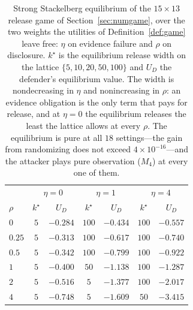 \begin{table}[t]
\caption{Strong Stackelberg equilibrium of the $15\times13$ release game
of Section~\ref{sec:numgame}, over the two weights the utilities of
Definition~\ref{def:game} leave free: $\eta$ on evidence failure and $\rho$ on
disclosure. $k^\star$ is the equilibrium release width on the lattice
$\{5,10,20,50,100\}$ and $U_D$ the defender's equilibrium value. The width is
nondecreasing in $\eta$ and nonincreasing in $\rho$: an evidence obligation is
the only term that pays for release, and at $\eta=0$ the equilibrium releases
the least the lattice allows at every $\rho$. The equilibrium is pure at all
$18$ settings---the gain from randomizing does not
exceed $4\times10^{-16}$---and the attacker plays pure observation
($M_4$) at every one of them.}
\label{tab:numgame}
\centering
\footnotesize
\begin{tabular}{@{}lcccccc@{}}
\toprule
& \multicolumn{2}{c}{$\eta=0$} & \multicolumn{2}{c}{$\eta=1$} & \multicolumn{2}{c}{$\eta=4$}\\
$\rho$ & $k^\star$ & $U_D$ & $k^\star$ & $U_D$ & $k^\star$ & $U_D$\\
\midrule
$0$ & $5$ & $-0.284$ & $100$ & $-0.434$ & $100$ & $-0.557$\\
$0.25$ & $5$ & $-0.313$ & $100$ & $-0.617$ & $100$ & $-0.740$\\
$0.5$ & $5$ & $-0.342$ & $100$ & $-0.799$ & $100$ & $-0.922$\\
$1$ & $5$ & $-0.400$ & $50$ & $-1.138$ & $100$ & $-1.287$\\
$2$ & $5$ & $-0.516$ & $5$ & $-1.377$ & $100$ & $-2.017$\\
$4$ & $5$ & $-0.748$ & $5$ & $-1.609$ & $50$ & $-3.415$\\
\bottomrule
\end{tabular}
\end{table}
